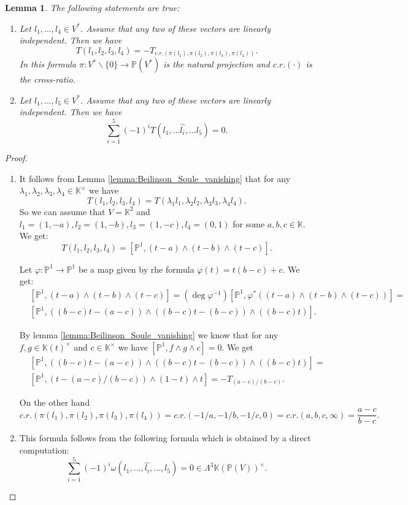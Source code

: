 \documentclass[12pt]{extarticle}
\newtheorem{lemma}[theorem]{Lemma}
\def\mb{\mathbb}
\def\k{\mb K}
\def\t{\times}
\def\cl{\colon}
\renewcommand{\P}{{\mb P}}
\def\bs{\backslash}
\newcommand{\EP}[2]{{\Lambda^{#1}\k(#2)^\times}}
\begin{document}
\begin{lemma}The following statements are true:
    \begin{enumerate}
        \item Let $l_1,\dots, l_4\in V^*$. Assume that any two of these vectors are linearly independent. Then we have
        $$T(l_1, l_2, l_3, l_4)=-T_{c.r.(\pi(l_1),\pi(l_2), \pi(l_3), \pi(l_4))}.$$
        In this formula $\pi\colon V^*\bs \{0\}\to \P(V^*)$ is the natural projection and $c.r.(\cdot)$ is the cross-ratio.
         \item Let $l_1,\dots, l_5\in V^*$. Assume that any two of these vectors are linearly independent. Then we have
        $$\sum\limits_{i=1}^5(-1)^iT(l_1,\dots\hat{l_i},\dots l_5)=0.$$
    \end{enumerate}
\end{lemma}

\begin{proof}\begin{enumerate}
\item
   It follows from Lemma \ref{lemma:Beilinson_Soule_vanishing} that for any $\lambda_1,\lambda_2, \lambda_3, \lambda_4\in \k^\t$ we have
    $$T(l_1, l_2, l_3, l_4)=T(\lambda_1 l_1, \lambda_2 l_2,\lambda_3 l_3,\lambda_4 l_4).$$
    So we can assume that $V=\k^2$ and $l_1=(1,-a), l_2=(1,-b), l_3=(1,-c), l_4=(0,1)$ for some $a,b,c\in \k$. We get:
    $$T(l_1, l_2, l_3, l_4)=[\P^1, (t-a)\wedge(t-b)\wedge (t-c)].$$

    Let $\varphi\cl \P^1\to\P^1$ be a map given by rhe formula $\varphi(t)=t(b-c)+c$. We get:
    \begin{align*}
       & [\P^1, (t-a)\wedge (t-b)\wedge (t-c)]=(\deg \varphi^{-1})[\P^1, \varphi^*((t-a)\wedge (t-b)\wedge (t-c))]=\\
       &[\P^1, ((b-c)t-(a-c))\wedge ((b-c)t-(b-c))\wedge ((b-c)t)].
    \end{align*}

    By lemma \ref{lemma:Beilinson_Soule_vanishing} we know that for any $f,g\in\k(t)^\times$ and $c\in\k^\times$ we have $[\P^1,f\wedge g\wedge c]=0$. We get
    \begin{align*}
        &[\P^1, ((b-c)t-(a-c))\wedge ((b-c)t-(b-c))\wedge ((b-c)t)]=\\&[\P^1, (t-(a-c)/(b-c))\wedge (1-t)\wedge t]=-T_{(a-c)/(b-c)}.
    \end{align*}


On the other hand
$$c.r.(\pi(l_1), \pi(l_2), \pi(l_3), \pi(l_4))=c.r.(-1/a,-1/b,-1/c,0)=c.r.(a,b,c,\infty)=\dfrac{a-c}{b-c}.$$

\item This formula follows from the following formula which is obtained by a direct computation:
$$\sum\limits_{i=1}^5(-1)^i\omega(l_1,\dots, \widehat{l_i},\dots, l_5)=0\in \EP{3}{\P(V)}.$$
\end{enumerate}
\end{proof}
\end{document}
